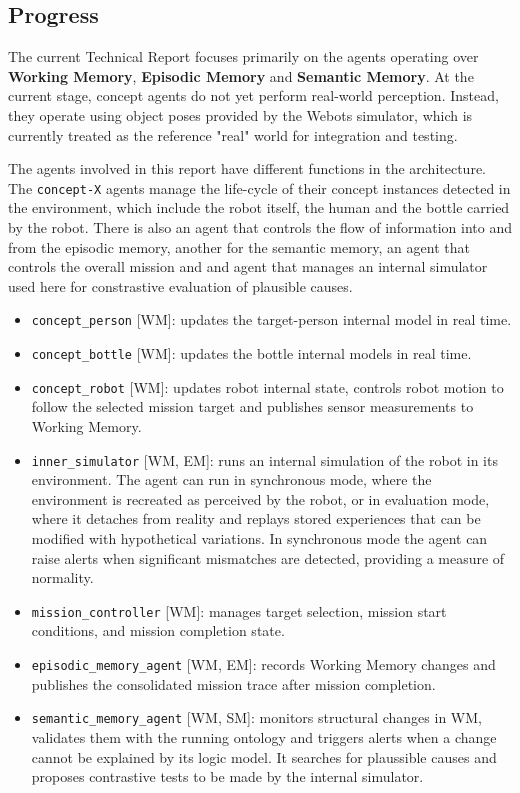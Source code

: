 \documentclass[a4paper, twoside]{article}
\begin{document}
\subsection{Progress}

The current Technical Report focuses primarily on the agents operating over \textbf{Working Memory}, \textbf{Episodic Memory} and \textbf{Semantic Memory}. At the current stage, concept agents do not yet perform real-world perception. Instead, they operate using object poses provided by the Webots simulator, which is currently treated as the reference "real" world for integration and testing.


The agents involved in this report have different functions in the architecture. The \texttt{concept-X} agents manage the life-cycle of their concept instances detected in the environment, which include the robot itself, the human and the bottle carried by the robot. There is also an agent that controls the flow of information into and from the episodic memory, another for the semantic memory, an agent that controls the overall mission and and agent that manages an internal simulator used here for constrastive evaluation of plausible causes.

\begin{itemize}
    \item \texttt{concept\_person} [WM]: updates the target-person internal model in real time.
    \item \texttt{concept\_bottle} [WM]: updates the bottle internal models in real time.
    \item \texttt{concept\_robot} [WM]: updates robot internal state, controls robot motion to follow the selected mission target and publishes sensor measurements to Working Memory.
    \item \texttt{inner\_simulator} [WM, EM]: runs an internal simulation of the robot in its environment. The agent can run in synchronous mode, where the environment is recreated as perceived by the robot, or in evaluation mode, where it detaches from reality and replays stored experiences that can be modified with hypothetical variations.
    In synchronous mode the agent can raise alerts when significant mismatches are detected, providing a measure of normality.
    \item \texttt{mission\_controller} [WM]: manages target selection, mission start conditions, and mission completion state.
    \item \texttt{episodic\_memory\_agent} [WM, EM]: records Working Memory changes and publishes the consolidated mission trace after mission completion.
    \item \texttt{semantic\_memory\_agent} [WM, SM]: monitors structural changes in WM, validates them with the running ontology and triggers alerts when a change cannot be explained by its logic model. It searches for plaussible causes and proposes contrastive tests to be made by the internal simulator.
    
\end{itemize}
\end{document}
